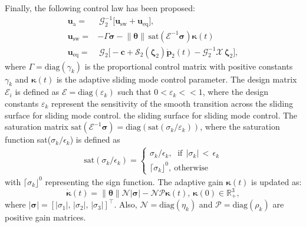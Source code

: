 \documentclass[lettersize,journal]{IEEEtran}
\begin{document}
Finally, the following control law has been proposed:
\begin{align} \label{adaptive control law: equation}
    \boldsymbol{u}_\text{a} =&~ \mathcal{G}_2^{-1} \big[ \boldsymbol{u}_{\text{sw}} + \boldsymbol{u}_{\text{eq}} \big], \nonumber \\
    \boldsymbol{u}_{\text{sw}} =& - \Gamma \boldsymbol{\sigma} - \lVert \boldsymbol{\theta} \rVert \, \text{sat}(\mathcal{E}^{-1}\boldsymbol{\sigma}) \boldsymbol{\kappa}(t)\nonumber\\
    \boldsymbol{u}_{\text{eq}} =&~\mathcal{G}_2 \big[- \boldsymbol{c} + \mathcal{S}_2(\boldsymbol{\zeta}_2) \dot{\boldsymbol{p}}_2(t) - \mathcal{G}_{2}^{-1} \mathcal{X}\,\boldsymbol{\zeta}_2 \big],
\end{align}
where $\Gamma = \text{diag}(\gamma_{k})$  is the proportional control matrix with positive constants $\gamma_{k}$ and $\boldsymbol{\kappa}(t)$ is the adaptive sliding mode control parameter.
The design matrix $\mathcal{E}_i$ is defined as $\mathcal{E} = \text{diag}(\varepsilon_{k})$ such that $0 < \varepsilon_{k} << 1$, where the design constants $\varepsilon_{k}$ represent the sensitivity of the smooth transition across the sliding surface for sliding mode control.
the sliding surface for sliding mode control.
The saturation matrix $\text{sat}(\mathcal{E}^{-1}\boldsymbol{\sigma}) = \text{diag}(\text{sat}(\sigma_{k}/\varepsilon_{k}))$, where the saturation function sat($\sigma_k/\epsilon_k$) is defined as
\begin{align}
\label{sat_fn}
\text{sat}(\sigma_k/\epsilon_k)=\begin{cases}
    \sigma_k/\epsilon_k,~~\,\text{if}~~\rvert\sigma_k\rvert\,<\,\epsilon_k\\
    \lceil \sigma_k\rfloor^0,~\text{otherwise}
    \end{cases}
\end{align}
with $\lceil \sigma_k \rfloor^0$ representing the sign function.
The adaptive gain $\boldsymbol{\kappa}(t)$ is updated as:
\begin{equation} \label{adaptive law: equation}
    \dot{\boldsymbol{\kappa}}(t) =  \lVert \boldsymbol{\theta} \rVert \mathcal{N} \lvert \boldsymbol{\sigma} \rvert - \mathcal{N} \mathcal{P} \boldsymbol{\kappa}(t), \, \boldsymbol{\kappa}(0) \in \mathbb{R}_+^3,
\end{equation}
where $\lvert \boldsymbol{\sigma} \rvert  = \left[\lvert \sigma_{1} \rvert,\, \lvert \sigma_{2} \rvert,\, \lvert \sigma_{3} \rvert\right]^{\top}$. Also, $\mathcal{N} = \text{diag}(\eta_{k})$ and $\mathcal{P} = \text{diag}(\rho_{k})$ are positive gain matrices.
\end{document}
